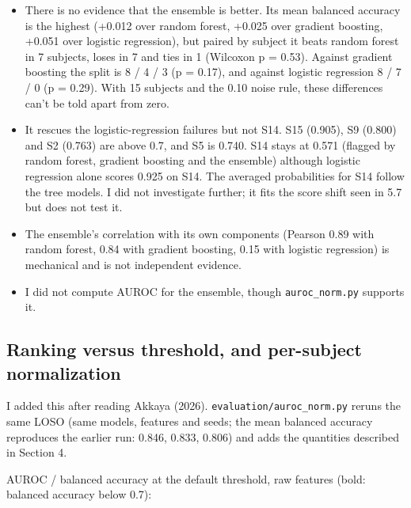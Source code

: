 \documentclass[11pt]{article}
\providecommand{\tightlist}{\setlength{\itemsep}{2pt}\setlength{\parskip}{0pt}}
\begin{document}
\begin{itemize}
\tightlist
\item
  There is no evidence that the ensemble is better. Its mean balanced
  accuracy is the highest (+0.012 over random forest, +0.025 over
  gradient boosting, +0.051 over logistic regression), but paired by
  subject it beats random forest in 7 subjects, loses in 7 and ties in 1
  (Wilcoxon p = 0.53). Against gradient boosting the split is 8 / 4 / 3
  (p = 0.17), and against logistic regression 8 / 7 / 0 (p = 0.29). With
  15 subjects and the 0.10 noise rule, these differences can't be told
  apart from zero.
\item
  It rescues the logistic-regression failures but not S14. S15 (0.905),
  S9 (0.800) and S2 (0.763) are above 0.7, and S5 is 0.740. S14 stays at
  0.571 (flagged by random forest, gradient boosting and the ensemble)
  although logistic regression alone scores 0.925 on S14. The averaged
  probabilities for S14 follow the tree models. I did not investigate
  further; it fits the score shift seen in 5.7 but does not test it.
\item
  The ensemble's correlation with its own components (Pearson 0.89 with
  random forest, 0.84 with gradient boosting, 0.15 with logistic
  regression) is mechanical and is not independent evidence.
\item
  I did not compute AUROC for the ensemble, though
  \texttt{auroc\_norm.py} supports it.
\end{itemize}

\hypertarget{ranking-versus-threshold-and-per-subject-normalization}{%
\subsection{Ranking versus threshold, and per-subject
normalization}\label{ranking-versus-threshold-and-per-subject-normalization}}

I added this after reading Akkaya (2026).
\texttt{evaluation/auroc\_norm.py} reruns the same LOSO (same models,
features and seeds; the mean balanced accuracy reproduces the earlier
run: 0.846, 0.833, 0.806) and adds the quantities described in Section
4.

AUROC / balanced accuracy at the default threshold, raw features (bold:
balanced accuracy below 0.7):
\end{document}
